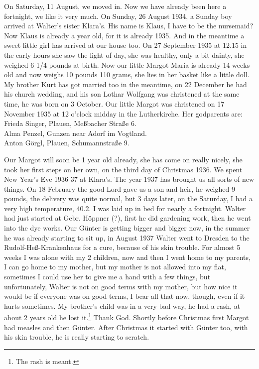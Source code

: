\documentclass[a5paper,11pt,openany]{book}
\newcommand{\seite}[1]{\leavevmode\marginpar{\footnotesize\itshape\raggedright #1}\ignorespaces}
\newcommand{\jahr}[1]{\par\medskip\noindent{\scshape #1}\par\nopagebreak}
\begin{document}
\seite{38}
On Saturday, 11 August, we moved in.
Now we have already been here a fortnight, we like it very much.
On Sunday, 26 August 1934, a Sunday boy arrived at Walter's sister Klara's.
His name is Klaus, I have to be the nursemaid?
Now Klaus is already a year old, for it is already 1935.
And in the meantime a sweet little girl has arrived at our house too.
On 27 September 1935 at 12.15 in the early hours she saw the light of day,
  she was healthy, only a bit dainty, she weighed 6 1/4 pounds at birth.
Now
\seite{39}
our little Margot Maria is already 14 weeks old and now weighs 10 pounds 110 grams, she lies in her basket like a little doll.
My brother Kurt has got married too in the meantime, on 22 December he had his church wedding,
  and his son Lothar Wolfgang was christened at the same time, he was born on 3 October.
Our little Margot was christened on 17 November 1935 at 12 o'clock midday in the Lutherkirche.
Her godparents are:\\
Frieda Singer, Plauen, Meßbacher Straße 6.\\
Alma Penzel, Gunzen near Adorf im Vogtland.\\
Anton Görgl, Plauen, Schumannstraße 9.

\jahr{The year 1936.}
\seite{40}
Our Margot will soon be 1 year old already, she has come on really nicely,
  she took her first steps on her own, on the third day of Christmas 1936.
We spent New Year's Eve 1936-37 at Klara's.
The year 1937 has brought us all sorts of new things.
On 18 February the good Lord gave us a son and heir, he weighed 9 pounds, the delivery was quite normal,
  but 3 days later, on the Saturday, I had a very high temperature, 40.2.
I was laid up in bed for nearly a fortnight.
Walter had just started at Gebr. Höppner (?), first he did gardening work, then he went
\seite{41}
into the dye works.
Our Günter is getting bigger and bigger now, in the summer he was already starting to sit up,
  in August 1937 Walter went to Dresden to the Rudolf-Heß-Krankenhaus for a cure, because of his skin trouble.
For almost 5 weeks I was alone with my 2 children,
  now and then I went home to my parents, I can go home to my mother,
  but my mother is not allowed into my flat, sometimes I could use her to give me a hand with a few things, but unfortunately,
  Walter is not on good terms with my mother, but how nice it would be if everyone was on good terms, I
\seite{42}
[have to] bear all that now, though, even if it hurts sometimes.
My brother's child was in a very bad way, he had a rash, at about 2 years old he lost it.\footnote{The rash is meant.}
Thank God.
Shortly before Christmas first Margot had measles and then Günter.
After Christmas it started with Günter too, with his skin trouble, he is really starting to scratch.
\end{document}
